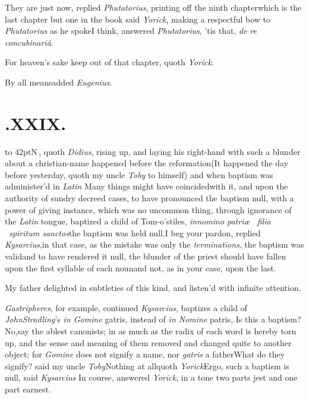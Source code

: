 \documentclass{article}
\begin{document}
They are just now, replied \textit{Phutatorius}, printing off the
ninth chapter\tsk which is the last chapter but one in the
book\tsk{} said
\textit{Yorick}, making a respectful bow to \textit{Phutatorius} as he
spoke\tsk I think, answered \textit{Phutatorius},
’tis that, \textit{de re concubinariâ}.

For heaven’s sake keep out of that chapter, quoth
\textit{Yorick}.

\tsh By all means\tsk added \textit{Eugenius}.

\bigskip
\section{.\enspace XXIX.}

\lettrine{\hskip-3pt\hbox to 42pt{\Tsk N}}{\,}, quoth \textit{Didius},
rising up, and laying his right-hand with 
such a blunder about a christian-name
happened before the reformation\tsk (It happened the day
before yesterday, quoth my uncle \textit{Toby} to himself) and
when baptism was administer’d in
\textit{Latin}\tsh\break
{}\break
\tsk Many things might have coincided\break with it, and
upon the authority of sundry decreed cases, to have pronounced the
baptism null, with a power of giving
instance, which was no uncommon thing, through
ignorance of the \textit{Latin} tongue, baptized a child of
Tom-o’stiles, \textit{in\break nomino patriæ \et\ filia \et\
spiritum sanctos}\break\tsk the baptism was held
null.\tsk I beg your pardon, replied
\textit{Kysarcius},\tsk in that case, as the mistake was only
the \textit{terminations}, the baptism was valid\tsh and to
have rendered it null, the blunder of the priest should have fallen
upon the first syllable of each noun\tsh and not, as in
your case, upon the last.\tsk

My father delighted in subtleties of this kind, and
listen’d with infinite attention.

\textit{Gastripheres}, for example, continued \textit{Kysarcius},
baptizes a child of \textit{John\break Stradling}’s \textit{in Gomine}
gatris, \etc \etc\catch{instead} instead of \textit{in Nomine} patris,
\etc\tsk Is this a baptism? No,\tsk say the ablest
canonists; in as much as the radix of each word is hereby torn up,
and the sense and meaning of them removed and changed quite to
another object; for \textit{Gomine} does not signify a name, nor
\textit{gatris} a father\tsk What do they signify? said my uncle
\textit{Toby}\tsk Nothing at all\tsh quoth
\textit{Yorick}\tsh Ergo, such a baptism is null, said
\textit{Kysarcius}\tsh
In course, answered \textit{Yorick}, in a tone two parts jest and
one\break
part earnest.\tsh
\end{document}
